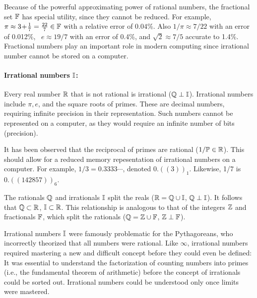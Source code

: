 \documentclass{ximera}
\begin{document}
Because of the powerful approximating power of rational numbers, the fractional set $\mathbb{F}$ has special utility,
since they cannot be reduced.
For example, $\pi \approx 3\!+\!\frac{1}{7} = \frac{22}{7}\in \mathbb{F}$ with a relative error of $0.04$\%.
Also  $1/\pi\approx 7/22$ with an error of 0.012\%, ~$e \approx 19/7$ {with an error of} 0.4\%,
and $\sqrt{2}\approx 7/5$ accurate to 1.4\%.
Fractional numbers play an important role in modern computing since irrational number cannot be stored on a computer.
  


\label{Allen24}
\paragraph{Irrational numbers $\mathbb{I}$: \label{page:bbI} }
Every real number $\mathbb{R}$ that is not rational is irrational ($\mathbb{Q} \perp \mathbb{I}$).
Irrational numbers include $\pi, e$, and the square roots of primes.
These are decimal numbers, requiring infinite precision in their representation. 
Such numbers cannot be represented on a computer, as they would require an infinite number of bits (precision).

It has been observed that the reciprocal of primes are rational ($1/\mathbb{P} \in\mathbb{R} $).
This should allow for a reduced memory repesentation of irrational numbers on a computer. 
For example, $1/3 = 0.3333\cdots$, denoted $0.((3))_1$.  Likewise, 1/7 is $0.((142857))_6$.

The rationals $\mathbb{Q}$ and irrationals $\mathbb{I}$ split the reals ($\mathbb{R} = \mathbb{Q}\cup\mathbb{I}$, $\mathbb{Q}\perp\mathbb{I}$).
It follows that $\mathbb{Q}\subset\mathbb{R}$, $\mathbb{I}\subset\mathbb{R}$. 
This relationship is analogous to that of the integers $\mathbb{Z}$ and fractionals $\mathbb{F}$, which split the rationals
($\mathbb{Q} = \mathbb{Z}\cup\mathbb{F}$, $\mathbb{Z}\perp\mathbb{F}$).

Irrational numbers $\mathbb{I}$ were famously problematic for the Pythagoreans, who incorrectly theorized that
all numbers were rational. 
Like $\infty$, irrational numbers required mastering a new and difficult concept before they could even
be defined:
It was essential to understand the factorization of counting numbers into primes (i.e., the fundamental
theorem of arithmetic) before the concept of irrationals could be sorted out. 
Irrational numbers could be understood only once limits were mastered.
\end{document}
